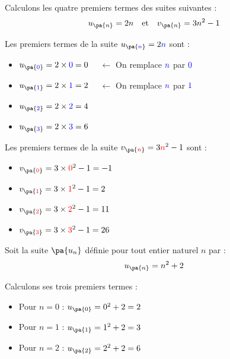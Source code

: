 \begin{methode}
	Calculons les quatre premiers termes des suites suivantes :
	\[
		u_{\pa{n}}=2n \quad\text{et}\quad v_{\pa{n}}=3n^{2} - 1
	\]

	\begin{correction}
		Les premiers termes de la suite $u_{\pa{{\color{blue}n}}}=2\color{blue}n$ sont :
		\begin{itemize}
			\item $u_{\pa{{\color{blue}0}}}=2 \times {\color{blue}0}=0$ $\quad\leftarrow$ On remplace $\color{blue}n$ par $\color{blue}0$
			\item $u_{\pa{{\color{blue}1}}}=2 \times {\color{blue}1}=2$ $\quad\leftarrow$ On remplace $\color{blue}n$ par $\color{blue}1$
			\item $u_{\pa{{\color{blue}2}}}=2 \times {\color{blue}2}=4$
			\item $u_{\pa{{\color{blue}3}}}=2 \times {\color{blue}3}=6$
		\end{itemize}

		Les premiers termes de la suite $v_{\pa{{\color{red}n}}}=3{\color{red}n}^{2} - 1$ sont :
		\begin{itemize}
			\item $v_{\pa{{\color{red}0}}}=3 \times {\color{red}0}^{2} - 1=-1$
			\item $v_{\pa{{\color{red}1}}}=3 \times {\color{red}1}^{2} - 1=2$
			\item $v_{\pa{{\color{red}2}}}=3 \times {\color{red}2}^{2} - 1=11$
			\item $v_{\pa{{\color{red}3}}}=3 \times {\color{red}3}^{2} - 1=26$
		\end{itemize}
	\end{correction}
\end{methode}

\begin{ex}
	Soit la suite $\pa{u_n}$ définie pour tout entier naturel $n$ par :
	\[
		u_{\pa{n}} = n^2 + 2
	\]

	Calculons ses trois premiers termes :
	\begin{itemize}
		\item Pour $n=0$ : $u_{\pa{0}} = 0^2 + 2 = 2$
		\item Pour $n=1$ : $u_{\pa{1}} = 1^2 + 2 = 3$
		\item Pour $n=2$ : $u_{\pa{2}} = 2^2 + 2 = 6$
	\end{itemize}
\end{ex}

